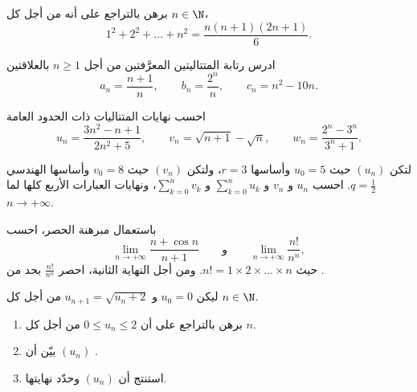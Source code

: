 \begin{exercise}[$\star$]\label{exo:g12:seq:1}
برهن بالتراجع على أنه من أجل كل $n \in \N$،
\[
1^2 + 2^2 + \dots + n^2 = \frac{n(n+1)(2n+1)}{6}.
\]
\end{exercise}

\begin{exercise}[$\star$]\label{exo:g12:seq:2}
ادرس رتابة المتتاليتين المعرَّفتين من أجل $n \geq 1$ بالعلاقتين
\[
a_n = \frac{n+1}{n}, \qquad
b_n = \frac{2^n}{n}, \qquad
c_n = n^2 - 10n .
\]
\end{exercise}

\begin{exercise}[$\star$]\label{exo:g12:seq:3}
احسب نهايات المتتاليات ذات الحدود العامة
\[
u_n = \frac{3n^2 - n + 1}{2n^2 + 5}, \qquad
v_n = \sqrt{n+1} - \sqrt{n}, \qquad
w_n = \frac{2^n - 3^n}{3^n + 1}.
\]
\end{exercise}

\begin{exercise}[$\star$]\label{exo:g12:seq:4}
لتكن $(u_n)$  حيث $u_0 = 5$ وأساسها
$r = 3$، ولتكن $(v_n)$  حيث $v_0 = 8$ وأساسها الهندسي
$q = \frac{1}{2}$. احسب $u_n$ و $v_n$ و $\sum_{k=0}^{n} u_k$ و
$\sum_{k=0}^{n} v_k$، ونهايات العبارات الأربع كلها لما
$n \to +\infty$.
\end{exercise}

\begin{exercise}[$\star\star$]\label{exo:g12:seq:5}
باستعمال مبرهنة الحصر، احسب
\[
\lim_{n\to+\infty} \frac{n + \cos n}{n + 1}
\qquad\text{و}\qquad
\lim_{n\to+\infty} \frac{n!}{n^n},
\]
حيث $n! = 1 \times 2 \times \dots \times n$. ومن أجل النهاية الثانية، احصر
$\frac{n!}{n^n}$ بحد من .
\end{exercise}

\begin{exercise}[$\star\star$]\label{exo:g12:seq:6}
ليكن $u_0 = 0$ و $u_{n+1} = \sqrt{u_n + 2}$ من أجل كل $n \in \N$.
\begin{enumerate}
  \item برهن بالتراجع على أن $0 \leq u_n \leq 2$ من أجل كل $n$.
  \item بيّن أن $(u_n)$ .
  \item استنتج أن $(u_n)$  وحدّد نهايتها.
\end{enumerate}
\end{exercise}

